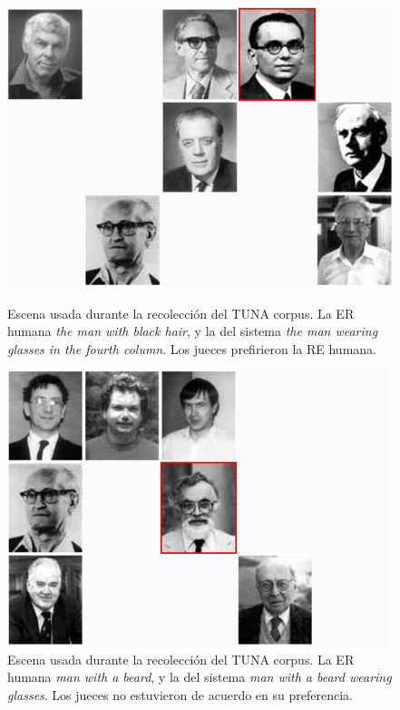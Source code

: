 \begin{figure}[h]
\begin{minipage}{0.48\linewidth}
\centering
\includegraphics[width=\textwidth]{images/s59t26.jpg}
\caption{Escena usada durante la recolecci\'on del TUNA corpus. La ER humana \emph{the man with black hair}, y la del sistema \emph{the man wearing glasses in the fourth column}. Los jueces prefirieron la RE humana.}
\label{s28t25}
\end{minipage}
\hspace*{.04cm}
\begin{minipage}{0.48\linewidth}
\centering
\includegraphics[width=\textwidth]{images/s315t21.jpg}
\vspace*{-.3cm}
\caption{Escena usada durante la recolecci\'on del TUNA corpus. La ER humana \emph{man with a beard},  y la del sistema \emph{man with a beard wearing glasses}. Los jueces no estuvieron de acuerdo en su preferencia.}
\label{s307t21}
\end{minipage}
\end{figure}

